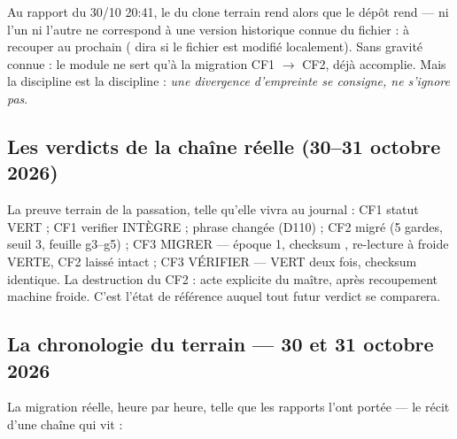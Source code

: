 \begin{terrain}
Au rapport du 30/10 20:41, le  du clone terrain rend
 alors que le dépôt rend  — ni l'un ni
l'autre ne correspond à une version historique connue du fichier : à recouper au
prochain  ( dira si le fichier est modifié localement).
Sans gravité connue : le module ne sert qu'à la migration CF1 $\to$ CF2, déjà
accomplie. Mais la discipline est la discipline : \emph{une divergence d'empreinte se
consigne, ne s'ignore pas}.
\end{terrain}

\subsection{Les verdicts de la chaîne réelle (30--31 octobre 2026)}

La preuve terrain de la passation, telle qu'elle vivra au journal : CF1 statut VERT ;
CF1 verifier INTÈGRE ; phrase changée (D110) ; CF2 migré (5 gardes, seuil 3, feuille
g3--g5) ; CF3 MIGRER — époque 1, checksum , re-lecture à froide VERTE,
CF2 laissé intact ; CF3 VÉRIFIER — VERT deux fois, checksum identique. La destruction
du CF2 : acte explicite du maître, après recoupement machine froide. C'est l'état de
référence auquel tout futur verdict se comparera.

\subsection{La chronologie du terrain — 30 et 31 octobre 2026}\label{sec:chronoterrain}

La migration réelle, heure par heure, telle que les rapports l'ont portée — le récit
d'une chaîne qui vit :

